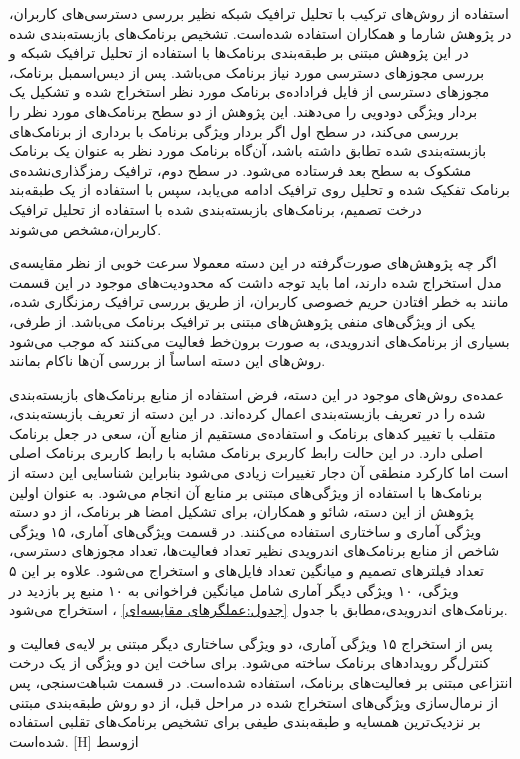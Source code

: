 استفاده از روش‌های ترکیب با تحلیل ترافیک شبکه نظیر بررسی دسترسی‌های کاربران، در پژوهش شارما و همکاران  استفاده شده‌است. تشخیص برنامک‌های بازبسته‌بندی شده در این پژوهش مبتنی بر طبقه‌بندی برنامک‌ها با استفاده از تحلیل ترافیک شبکه و بررسی مجوز‌های دسترسی مورد نیاز برنامک می‌باشد. پس از دیس‌اسمبل برنامک، مجوز‌های دسترسی از فایل فراداده‌ی‌ برنامک مورد نظر استخراج شده و تشکیل یک بردار ویژگی دودویی را می‌دهند. این پژوهش از دو سطح برنامک‌های مورد نظر را بررسی می‌کند، در سطح اول اگر بردار ویژگی برنامک با برداری از برنامک‌های بازبسته‌بندی شده تطابق داشته باشد، آن‌گاه برنامک مورد نظر به عنوان یک برنامک مشکوک به سطح بعد فرستاده می‌شود. در سطح دوم، ترافیک رمزگذاری‌نشده‌‌ی برنامک تفکیک شده و تحلیل روی ترافیک  ادامه می‌یابد، سپس با استفاده از یک طبقه‌بند درخت تصمیم‌، برنامک‌های بازبسته‌بندی شده با استفاده از تحلیل ترافیک کاربران،‌مشخص می‌شوند.

اگر چه پژوهش‌های صورت‌گرفته در این دسته معمولا سرعت خوبی از نظر مقایسه‌ی مدل استخراج شده‌ دارند، اما باید توجه داشت که محدودیت‌های موجود در این قسمت مانند به خطر افتادن حریم خصوصی کاربران، از طریق بررسی ترافیک رمز‌نگاری شده، یکی از ویژگی‌های منفی پژوهش‌های مبتنی بر ترافیک برنامک می‌باشد. از طرفی، بسیاری از برنامک‌های اندرویدی، به صورت برون‌خط فعالیت می‌کنند که موجب می‌شود روش‌های این دسته اساساً از بررسی آن‌ها ناکام بمانند.


عمده‌ی روش‌های موجود در این دسته، فرض استفاده از منابع برنامک‌های بازبسته‌بندی شده را در تعریف بازبسته‌بندی اعمال کرده‌اند. در این دسته از تعریف بازبسته‌بندی، متقلب با تغییر کد‌های برنامک و استفاده‌ی مستقیم از منابع آن، سعی در جعل برنامک اصلی دارد. در این حالت رابط کاربری برنامک مشابه با رابط کاربری برنامک اصلی است اما کارکرد منطقی آن دجار تغییرات زیادی می‌شود بنابراین شناسایی این دسته از برنامک‌ها با استفاده از ویژگی‌های مبتنی بر منابع آن انجام می‌شود. به عنوان اولین پژوهش از این دسته، شائو و همکاران، برای تشکیل امضا هر برنامک، از دو دسته ویژگی آماری‌ و ساختاری‌ استفاده می‌کنند. در قسمت ویژگی‌های آماری، ۱۵ ویژگی شاخص از منابع برنامک‌های اندرویدی نظیر تعداد فعالیت‌ها‌، تعداد مجوز‌های دسترسی، تعداد فیلتر‌های تصمیم‌ و میانگین تعداد فایل‌های  و  استخراج می‌شود. علاوه بر این ۵ ویژگی، ۱۰ ویژگی دیگر آماری شامل میانگین فراخوانی به ۱۰ منبع پر بازدید در برنامک‌های اندرویدی،مطابق با جدول
\ref{جدول:عملگرهای مقایسه‌ای}
، استخراج می‌شود.

پس از استخراج ۱۵ ویژگی آماری، دو ویژگی ساختاری دیگر مبتنی بر لایه‌ی فعالیت و کنترل‌گر رویداد‌های‌ برنامک ساخته می‌شود. برای ساخت این دو ویژگی از یک درخت انتزاعی مبتنی بر فعالیت‌های برنامک، استفاده شده‌است. در قسمت شباهت‌سنجی، پس از نرمال‌سازی ویژگی‌های استخراج شده در مراحل قبل، از دو روش طبقه‌بندی مبتنی بر نزدیک‌ترین همسایه و طبقه‌بندی طیفی برای تشخیص برنامک‌های تقلبی استفاده شده‌است.
[H]
‌ازوسط

